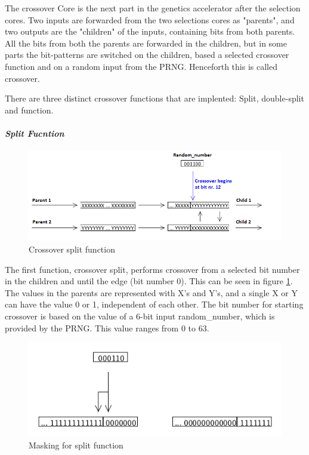 The crossover Core is the next part in the genetics accelerator after the selection cores. Two inputs are forwarded from the two selections cores as "parents", and two outputs are the "children" of the inputs, containing bits from both parents. All the bits from both the parents are forwarded in the children, but in some parts the bit-patterns are switched on the children, based a selected crossover function and on a random input from the PRNG. Henceforth this is called crossover.

There are three distinct crossover functions that are implented: Split, double-split and function.


\paragraph{\textit{Split Fucntion}}
\begin{figure}[H]
\includegraphics[width=\textwidth]{fpga/fig/crossover_split.png}
\caption{Crossover split function}
\label{fig_crossover_split}
\end{figure}

The first function, crossover split, performs crossover from a selected bit number in the children and until the edge (bit number 0). This can be seen in figure \ref{fig_crossover_split}. The values in the parents are represented with X's and Y's, and a single X or Y can have the value 0 or 1, independent of each other.
The bit number for starting crossover is based on the value of a 6-bit input random\_number, which is provided by the PRNG. This value ranges from 0 to 63.

\begin{figure}[H]
\includegraphics[width=\textwidth]{fpga/fig/crossover_split_mask.png}
\caption{Masking for split function}
\label{fig_crossover_split_mask}
\end{figure}

